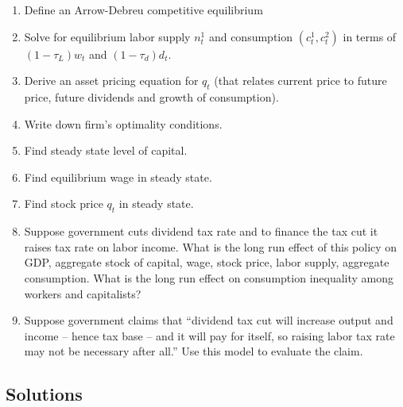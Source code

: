 \documentclass[10pt, a4paper]{article}
\begin{document}
    \begin{enumerate}
    \item Define an Arrow-Debreu competitive equilibrium

    \item Solve for equilibrium labor supply $n_t^1$ and consumption $(c_t^1, c_t^2)$ in terms of $(1-\tau_L)w_t$ and $(1-\tau_d)d_t$.

    \item Derive an asset pricing equation for $q_t$ (that relates current price to future price, future dividends and growth of consumption).

    \item Write down firm's optimality conditions.

    \item Find steady state level of capital.

    \item Find equilibrium wage in steady state.

    \item Find stock price $q_t$ in steady state.

    \item Suppose government cuts dividend tax rate and to finance the tax cut it raises tax rate on labor income. What is the long run effect of this policy on GDP, aggregate stock of capital, wage, stock price, labor supply, aggregate consumption. What is the long run effect on consumption inequality among workers and capitalists?

    \item Suppose government claims that ``dividend tax cut will increase output and income -- hence tax base -- and it will pay for itself, so raising labor tax rate may not be necessary after all.'' Use this model to evaluate the claim.
    \end{enumerate}
  \subsection*{Solutions}
\end{document}
